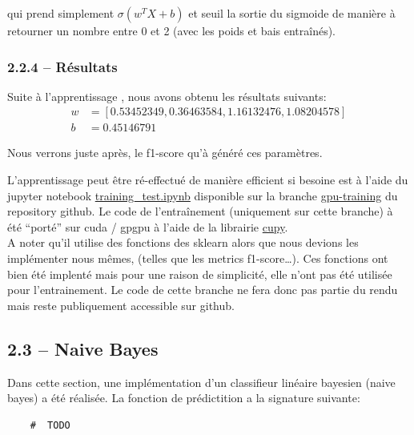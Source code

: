 \documentclass[
]{article}
\begin{document}
qui prend simplement \(\sigma(w^T X + b)\) et seuil la sortie du
sigmoide de manière à retourner un nombre entre 0 et 2 (avec les poids
et bais entraînés).

\hypertarget{ruxe9sultats}{%
\subsubsection{2.2.4 -- Résultats}\label{ruxe9sultats}}

Suite à l'apprentissage , nous avons obtenu les résultats suivants:
\begin{align*}
    w &= [0.53452349, 0.36463584, 1.16132476, 1.08204578]\\
    b &= 0.45146791
\end{align*}

Nous verrons juste après, le f1-score qu'à généré ces paramètres.

L'apprentissage peut être ré-effectué de manière efficient si besoine
est à l'aide du jupyter notebook
\href{https://github.com/David-Kyrat/13X005-AI-Project/blob/gpu-training/training_test.ipynb}{training\_test.ipynb}
disponible sur la branche
\href{https://github.com/David-Kyrat/13X005-AI-Project/blob/gpu-training/training_test.ipynb}{gpu-training}
du repository github. Le code de l'entraînement (uniquement sur cette
branche) à été ``porté'' sur cuda / gpgpu à l'aide de la librairie
\href{https://cupy.dev}{cupy}.\\
A noter qu'il utilise des fonctions des sklearn alors que nous devions
les implémenter nous mêmes, (telles que les metrics f1-score\ldots). Ces
fonctions ont bien été implenté mais pour une raison de simplicité, elle
n'ont pas été utilisée pour l'entrainement. Le code de cette branche ne
fera donc pas partie du rendu mais reste publiquement accessible sur
github.

\newpage{}

\hypertarget{naive-bayes-1}{%
\subsection{2.3 -- Naive Bayes}\label{naive-bayes-1}}

Dans cette section, une implémentation d'un classifieur linéaire
bayesien (naive bayes) a été réalisée. La fonction de prédictition a la
signature suivante:

\begin{lstlisting}
    #  TODO
\end{lstlisting}
\end{document}
